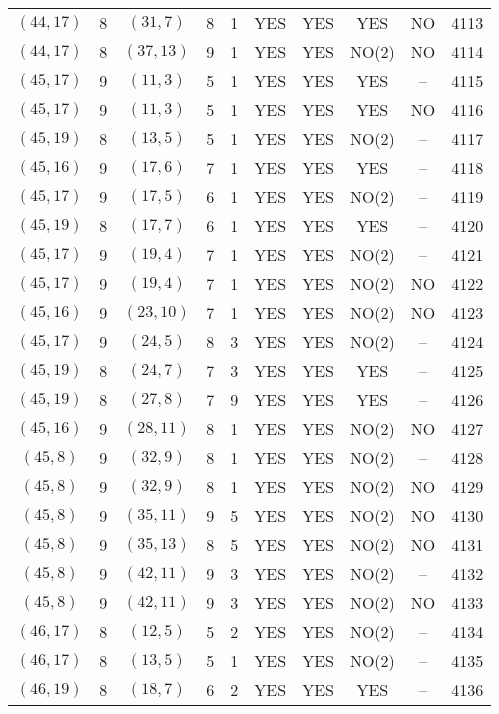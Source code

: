 \begin{longtable}{|c|c|c|c|c|c|c|c|c|c|}
$(44, 17)$ & 8 & $(31, 7)$ & 8 & 1 & YES & YES & YES & NO & 4113\\
$(44, 17)$ & 8 & $(37, 13)$ & 9 & 1 & YES & YES & NO(2) & NO & 4114\\
$(45, 17)$ & 9 & $(11, 3)$ & 5 & 1 & YES & YES & YES & -- & 4115\\
$(45, 17)$ & 9 & $(11, 3)$ & 5 & 1 & YES & YES & YES & NO & 4116\\
$(45, 19)$ & 8 & $(13, 5)$ & 5 & 1 & YES & YES & NO(2) & -- & 4117\\
$(45, 16)$ & 9 & $(17, 6)$ & 7 & 1 & YES & YES & YES & -- & 4118\\
$(45, 17)$ & 9 & $(17, 5)$ & 6 & 1 & YES & YES & NO(2) & -- & 4119\\
$(45, 19)$ & 8 & $(17, 7)$ & 6 & 1 & YES & YES & YES & -- & 4120\\
$(45, 17)$ & 9 & $(19, 4)$ & 7 & 1 & YES & YES & NO(2) & -- & 4121\\
$(45, 17)$ & 9 & $(19, 4)$ & 7 & 1 & YES & YES & NO(2) & NO & 4122\\
$(45, 16)$ & 9 & $(23, 10)$ & 7 & 1 & YES & YES & NO(2) & NO & 4123\\
$(45, 17)$ & 9 & $(24, 5)$ & 8 & 3 & YES & YES & NO(2) & -- & 4124\\
$(45, 19)$ & 8 & $(24, 7)$ & 7 & 3 & YES & YES & YES & -- & 4125\\
$(45, 19)$ & 8 & $(27, 8)$ & 7 & 9 & YES & YES & YES & -- & 4126\\
$(45, 16)$ & 9 & $(28, 11)$ & 8 & 1 & YES & YES & NO(2) & NO & 4127\\
$(45, 8)$ & 9 & $(32, 9)$ & 8 & 1 & YES & YES & NO(2) & -- & 4128\\
$(45, 8)$ & 9 & $(32, 9)$ & 8 & 1 & YES & YES & NO(2) & NO & 4129\\
$(45, 8)$ & 9 & $(35, 11)$ & 9 & 5 & YES & YES & NO(2) & NO & 4130\\
$(45, 8)$ & 9 & $(35, 13)$ & 8 & 5 & YES & YES & NO(2) & NO & 4131\\
$(45, 8)$ & 9 & $(42, 11)$ & 9 & 3 & YES & YES & NO(2) & -- & 4132\\
$(45, 8)$ & 9 & $(42, 11)$ & 9 & 3 & YES & YES & NO(2) & NO & 4133\\
$(46, 17)$ & 8 & $(12, 5)$ & 5 & 2 & YES & YES & NO(2) & -- & 4134\\
$(46, 17)$ & 8 & $(13, 5)$ & 5 & 1 & YES & YES & NO(2) & -- & 4135\\
$(46, 19)$ & 8 & $(18, 7)$ & 6 & 2 & YES & YES & YES & -- & 4136\\

\end{longtable}
